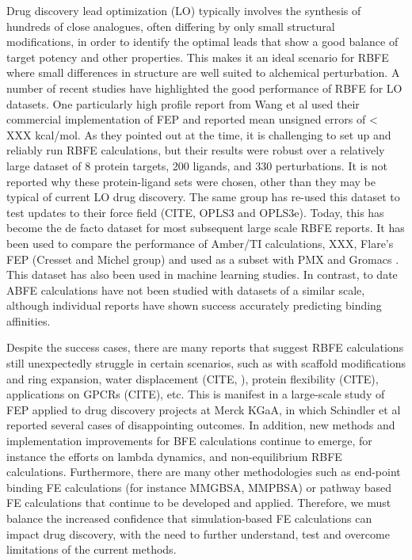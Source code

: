 \documentclass[9pt,bestpractices]{livecoms}
\begin{document}
Drug discovery lead optimization (LO) typically involves the synthesis of hundreds of close analogues, often differing by only small structural modifications, in order to identify the optimal leads that show a good balance of target potency and other properties. This makes it an ideal scenario for RBFE where small differences in structure are well suited to alchemical perturbation. A number of recent studies have highlighted the good performance of RBFE for LO datasets. One particularly high profile report from Wang et al\cite{wangAccurateReliablePrediction2015} used their commercial implementation of FEP and reported mean unsigned errors of < XXX kcal/mol. As they pointed out at the time, it is challenging to set up and reliably run RBFE calculations, but their results were robust over a relatively large dataset of 8 protein targets, 200 ligands, and 330 perturbations. It is not reported why these protein-ligand sets were chosen, other than they may be typical of current LO drug discovery. The same group has re-used this dataset to test updates to their force field (CITE, OPLS3 and OPLS3e). Today, this has become the de facto dataset for most subsequent large scale RBFE reports. It has been used to compare the performance of Amber/TI calculations\cite{songUsingAMBER18Relative2019}, XXX, Flare’s FEP (Cresset and Michel group)\cite{kuhnAssessmentBindingAffinity2020} and used as a subset with PMX and Gromacs\cite{gapsysLargeScaleRelative2020} . This dataset has also been used in machine learning studies\cite{jimenezDEEPProteinLigand2018,jimenez-lunaDeltaDeltaNeuralNetworks2019}. In contrast, to date ABFE calculations have not been studied with datasets of a similar scale, although individual reports have shown success accurately predicting binding affinities\cite{aldeghiLargescaleAnalysisWater2018,courniaRigorousFreeEnergy2020}.

Despite the success cases, there are many reports that suggest RBFE calculations still unexpectedly struggle in certain scenarios, such as with scaffold modifications\cite{wangAccurateModelingScaffold2017} and ring expansion\cite{liuRingBreakingFeasible2015}, water displacement (CITE, ), protein flexibility (CITE), applications on GPCRs (CITE), etc. This is manifest in a large-scale study of FEP applied to drug discovery projects at Merck KGaA, in which Schindler et al reported several cases of disappointing outcomes.\cite{schindlerLargeScaleAssessmentBinding2020} In addition, new methods and implementation improvements for BFE calculations continue to emerge, for instance the efforts on lambda dynamics\cite{knightMultisiteDynamicsSimulated2011,vilseckPredictingBindingFree2018}, and non-equilibrium RBFE calculations\cite{gapsysLargeScaleRelative2020,rufaChemicalAccuracyAlchemical2020}. Furthermore, there are many other methodologies such as end-point binding FE calculations (for instance MMGBSA, MMPBSA) or pathway based FE calculations that continue to be developed and applied. Therefore, we must balance the increased confidence that simulation-based FE calculations can impact drug discovery, with the need to further understand, test and overcome limitations of the current methods. 
\end{document}

